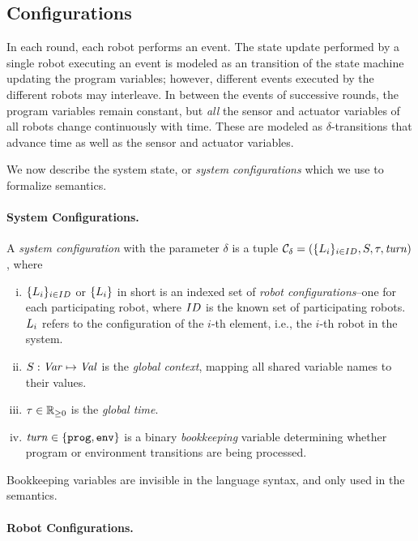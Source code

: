 \subsection{Configurations}\label{sec:configs}

In each round, each robot performs an event.
The state update performed by a single robot executing an event is modeled as an transition of the state machine updating the program variables;
however, different events executed by the different robots may interleave.
In between the events of successive rounds, the program variables remain constant,
but {\em all\/} the sensor and actuator variables of all robots change continuously with time.
These are modeled as $\delta$-transitions that advance time as well as the sensor and actuator variables.

We now describe the system state, or \emph{system configurations} which we use to formalize \lgname semantics.

\paragraph{System Configurations.}

A {\em system configuration\/} with the parameter $\delta$ is a tuple
$\mathcal{C}_\delta = (\{L_{i}\}_{i\in ID},{S},\tau,\mathit{turn})$, where

\begin{enumerate}[i)]
\item $\{L_{i}\}_{i\in ID}$ or $\{L_{i}\}$ in short is an indexed set of \emph{robot configurations}--one for each participating robot,
      where $ID$ is the known set of participating robots.
      $L_{i}$ refers to the configuration of the $i$-th element, i.e., the $i$-th robot in the system.
\item ${S} : \mathit{Var} \mapsto \mathit{Val}$ is the {\em global context\/}, mapping all shared variable names to their values.
\item $\tau\in \nnreals$ is the {\em global time\/}.
\item $\mathit{turn}\in\{\mathtt{prog},\mathtt{env}\}$ is a binary \emph{bookkeeping} variable determining whether  program or environment transitions are being processed.
\end{enumerate}

Bookkeeping variables are invisible in the language syntax, and only used in the semantics.


\paragraph{Robot Configurations.}


